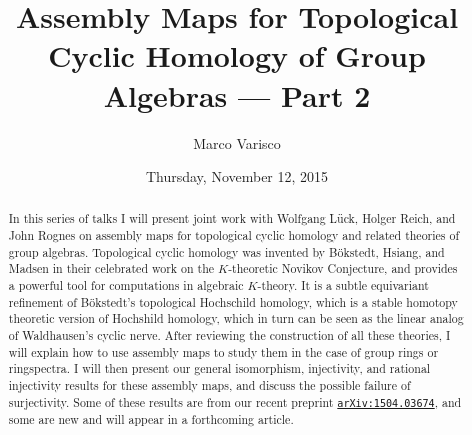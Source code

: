\documentclass{UAmathtalk}
\author{Marco Varisco}
\title{Assembly Maps for Topological Cyclic Homology of Group Algebras --- Part 2}
\date{Thursday, November 12, 2015}
\begin{document}
\maketitle

\begin{abstract}
In this series of talks I will present joint work with Wolfgang Lück, Holger Reich, and John Rognes on assembly maps for topological cyclic homology and related theories of group algebras.
Topological cyclic homology was invented by Bökstedt, Hsiang, and Madsen in their celebrated work on the $K$-theoretic Novikov Conjecture, and provides a powerful tool for computations in algebraic $K$-theory.
It is a subtle equivariant refinement of Bökstedt's topological Hochschild homology, which is a stable homotopy theoretic version of Hochshild homology, which in turn can be seen as the linear analog of Waldhausen's cyclic nerve.
After reviewing the construction of all these theories, I will explain how to use assembly maps to study them in the case of group rings or ringspectra.
I will then present our general isomorphism, injectivity, and rational injectivity results for these assembly maps, and discuss the possible failure of surjectivity.
Some of these results are from our recent preprint \href{https://arxiv.org/abs/1504.03674/}{\texttt{arXiv:1504.03674}}, and some are new and will appear in a forthcoming article.
\end{abstract}
\end{document}
